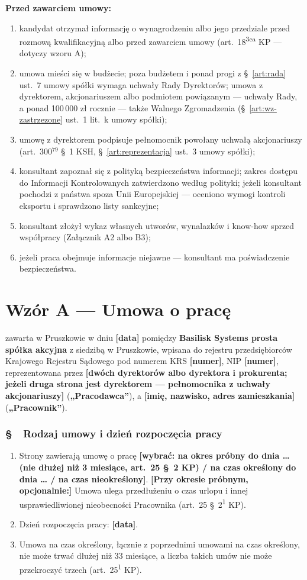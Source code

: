 \documentclass[11pt,a4paper]{report}
\newcounter{paragraf}
\newcommand{\paragraf}[1]{%
  \refstepcounter{paragraf}%
  \Needspace{5\baselineskip}%
  \subsection*{\S~\theparagraf\ #1}%
}
\newenvironment{ContractClause}[1]{\paragraf{#1}}{\par}
\newcommand{\field}[1]{\textbf{[#1]}}
\newcommand{\CompanyFull}{Basilisk Systems prosta spółka akcyjna}
\newcommand{\US}[1]{§~#1 umowy spółki}
\newcommand{\Strony}{\textbf{\CompanyFull{}} z siedzibą w Pruszkowie, wpisana do rejestru przedsiębiorców Krajowego Rejestru Sądowego pod numerem KRS \field{numer}, NIP \field{numer}, reprezentowana przez \field{dwóch dyrektorów albo dyrektora i prokurenta; jeżeli druga strona jest dyrektorem --- pełnomocnika z uchwały akcjonariuszy}}
\begin{document}
\textbf{Przed zawarciem umowy:}
\begin{enumerate}
  \item kandydat otrzymał informację o wynagrodzeniu albo jego przedziale przed rozmową kwalifikacyjną albo przed zawarciem umowy (art.~18\textsuperscript{3ca} KP --- dotyczy wzoru A);
  \item umowa mieści się w budżecie; poza budżetem i ponad progi z \US{\ref{art:rada} ust.~7} wymaga uchwały Rady Dyrektorów; umowa z dyrektorem, akcjonariuszem albo podmiotem powiązanym --- uchwały Rady, a ponad 100\,000 zł rocznie --- także Walnego Zgromadzenia (\US{\ref{art:wz-zastrzezone} ust.~1 lit.~k});
  \item umowę z dyrektorem podpisuje pełnomocnik powołany uchwałą akcjonariuszy (art.~300$^{79}$ §~1 KSH, \US{\ref{art:reprezentacja} ust.~3});
  \item konsultant zapoznał się z polityką bezpieczeństwa informacji; zakres dostępu do Informacji Kontrolowanych zatwierdzono według polityki; jeżeli konsultant pochodzi z państwa spoza Unii Europejskiej --- oceniono wymogi kontroli eksportu i sprawdzono listy sankcyjne;
  \item konsultant złożył wykaz własnych utworów, wynalazków i know-how sprzed współpracy (Załącznik A2 albo B3);
  \item jeżeli praca obejmuje informacje niejawne --- konsultant ma poświadczenie bezpieczeństwa.
\end{enumerate}

\chapter*{Wzór A --- Umowa o pracę}
\setcounter{paragraf}{0}

zawarta w Pruszkowie w dniu \field{data} pomiędzy \Strony{} (\textbf{„Pracodawca”}), a \field{imię, nazwisko, adres zamieszkania} (\textbf{„Pracownik”}).

\begin{ContractClause}{Rodzaj umowy i dzień rozpoczęcia pracy}
\begin{enumerate}
  \item Strony zawierają umowę o pracę \field{wybrać: na okres próbny do dnia \ldots{} (nie dłużej niż 3 miesiące, art.~25 §~2 KP) / na czas określony do dnia \ldots{} / na czas nieokreślony}. \field{Przy okresie próbnym, opcjonalnie:} Umowa ulega przedłużeniu o czas urlopu i innej usprawiedliwionej nieobecności Pracownika (art.~25 §~2\textsuperscript{1} KP).
  \item Dzień rozpoczęcia pracy: \field{data}.
  \item Umowa na czas określony, łącznie z poprzednimi umowami na czas określony, nie może trwać dłużej niż 33 miesiące, a liczba takich umów nie może przekroczyć trzech (art.~25\textsuperscript{1} KP).
\end{enumerate}
\end{ContractClause}
\end{document}
